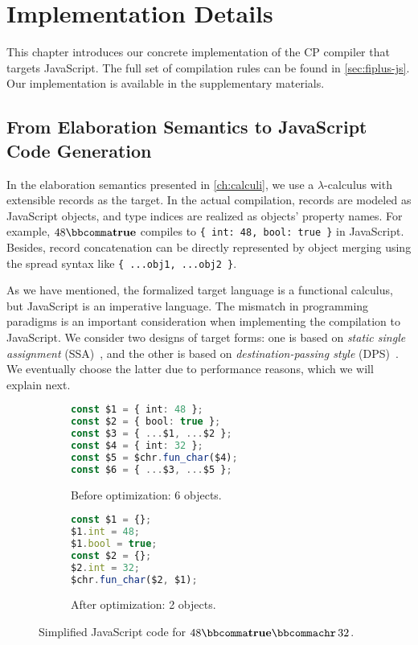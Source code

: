 \chapter{Implementation Details} \label{ch:compilation}

This chapter introduces our concrete implementation of the CP compiler that
targets JavaScript. The full set of compilation rules can be found in
\autoref{sec:fiplus-js}. Our implementation is available in the supplementary
materials.

\section{From Elaboration Semantics to JavaScript Code Generation}

In the elaboration semantics presented in \autoref{ch:calculi}, we use a
$\lambda$-calculus with extensible records as the target. In the actual
compilation, records are modeled as JavaScript objects, and type indices are
realized as objects' property names. For example, $48  \bbcomma   \mathbf{true} $ compiles to
\lstinline|{ int: 48, bool: true }| in JavaScript. Besides, record concatenation
can be directly represented by object merging using the spread syntax like
\lstinline|{ ...obj1, ...obj2 }|.

As we have mentioned, the formalized target language is a functional calculus,
but JavaScript is an imperative language. The mismatch in programming paradigms
is an important consideration when implementing the compilation to JavaScript.
We consider two designs of target forms: one is based on \emph{static single
assignment} (SSA)~\citep{cytron1991efficiently}, and the other is based on
\emph{destination-passing style} (DPS)~\citep{shaikhha2017destination}. We
eventually choose the latter due to performance reasons, which we will explain
next.

\begin{figure}
\centering
\begin{subfigure}{.37\textwidth}
\begin{lstlisting}[language=TypeScript]
const $1 = { int: 48 };
const $2 = { bool: true };
const $3 = { ...$1, ...$2 };
const $4 = { int: 32 };
const $5 = $chr.fun_char($4);
const $6 = { ...$3, ...$5 };
\end{lstlisting}
\caption{Before optimization: 6 objects.} \label{fig:six-objects}
\end{subfigure}%
\hspace{.1\textwidth}%
\begin{subfigure}{.33\textwidth}
\begin{lstlisting}[language=TypeScript]
const $1 = {};
$1.int = 48;
$1.bool = true;
const $2 = {};
$2.int = 32;
$chr.fun_char($2, $1);
\end{lstlisting}
\caption{After optimization: 2 objects.} \label{fig:two-objects}
\end{subfigure}
\caption{Simplified JavaScript code for $48  \bbcomma   \mathbf{true}   \bbcomma   \mathtt{chr}  \, 32$.}
\end{figure}

